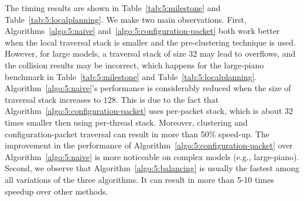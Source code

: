 \begin{table}[htb]
\begin{center}
\end{center}
\caption[Comparison of different CPU-based and GPU-based algorithms in the local planning component of PRM motion planner]{Comparison of different algorithms in local planning (timing in milliseconds). 32 and 128 are the
different sizes used for the traversal stack; C and no-C means refer to pre-clustering and not using pre-clustering, respectively; the timing of Algorithm~\ref{algo:5:balancing} includes two parts: traversal and balancing.}\label{tab:5:localplanning}
\end{table}

The timing results are shown in Table~\ref{tab:5:milestone} and Table~\ref{tab:5:localplanning}. We make two main observations. First, Algorithms~\ref{algo:5:naive} and~\ref{algo:5:configuration-packet} both work better when the local traversal stack is smaller and the pre-clustering technique is used. However, for large models, a traversal stack of size $32$ may lead to overflows, and the
collision results may be incorrect, which happens for the large-piano benchmark in Table~\ref{tab:5:milestone} and Table~\ref{tab:5:localplanning}. Algorithm~\ref{algo:5:naive}'s performance is considerably reduced when the size of traversal stack
increases to $128$. This is due to the fact that Algorithm~\ref{algo:5:configuration-packet} uses per-packet stack,
which is about $32$ times smaller then using per-thread stack. Moreover, clustering and  configuration-packet traversal
can result in more than 50\% speed-up. The improvement in the performance of
Algorithm~\ref{algo:5:configuration-packet} over Algorithm~\ref{algo:5:naive} is more noticeable on complex models (e.g., large-piano).
Second, we observe that Algorithm~\ref{algo:5:balancing} is usually the fastest among all variations of the three algorithms.
It can result in more than 5-10 times speedup over other methods.


